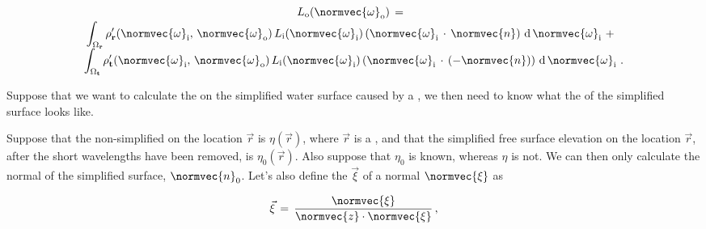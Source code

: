 {\begin{equation} \label{eq:rendering_equation_reduced}
\renewcommand*{\arraystretch}{1.5}
\begin{array}{cl}
L_{\text{o}}(\normvec{\omega}_{\text{o}}) \,= \\
\displaystyle \int_{\Omega_{\textbf{r}}} \rho'_{\textbf{r}}(\normvec{\omega}_{\text{i}},\, \normvec{\omega}_{\text{o}})\, L_{\text{i}}(\normvec{\omega}_{\text{i}})\, (\normvec{\omega}_{\text{i}}\,\cdot\,\normvec{n})\, \operatorname d \normvec{\omega}_{\text{i}} \ + \\[1ex]
\displaystyle \int_{\Omega_{\textbf{t}}} \rho'_{\textbf{t}}(\normvec{\omega}_{\text{i}},\, \normvec{\omega}_{\text{o}})\, L_{\text{i}}(\normvec{\omega}_{\text{i}})\, (\normvec{\omega}_{\text{i}}\,\cdot\,(-\normvec{n}))\, \operatorname d \normvec{\omega}_{\text{i}} & \!\!\!\! .
\end{array}
\end{equation}












\HRule

Suppose that we want to calculate the \shading on the simplified water surface caused by a , we then need to know what the  of the simplified surface looks like.

Suppose that the non-simplified  on the location $\vec{r}$ is $\eta(\vec{r})$, where $\vec{r}$ is a , and that the simplified free surface elevation on the location $\vec{r}$, after the short wavelengths have been removed, is $\eta_0(\vec{r})$. Also suppose that $\eta_0$ is known, whereas $\eta$ is not. We can then only calculate the normal of the simplified surface, $\normvec{n}_0$. Let's also define the  $\vec{\xi}$ of a normal $\normvec{\xi}$ as

\begin{equation}
\vec{\xi} \,=\, \frac{\normvec{\xi}}{\normvec{z}\cdot\normvec{\xi}}\,,
\end{equation}

}
